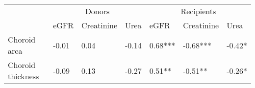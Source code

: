 \begin{tabular}{lllllll}
\toprule
\multirow{2}{*}{} & \multicolumn{3}{c}{Donors} & \multicolumn{3}{c}{Recipients} \\ \cmidrule(l){2-4}\cmidrule(l){5-7} 
 & eGFR & Creatinine & Urea & eGFR & Creatinine & Urea \\ 
 \midrule
Choroid area & -0.01 & 0.04 & -0.14 & 0.68*** & -0.68*** & -0.42* \\
Choroid thickness & -0.09 & 0.13 & -0.27 & 0.51** & -0.51** & -0.26* \\
\bottomrule
\end{tabular}
